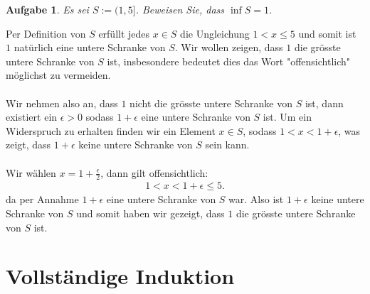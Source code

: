 \documentclass[a4paper, 20]{exam}
\newtheorem{ex}{Aufgabe}
\begin{document}
\begin{ex} Es sei $S:= (1, 5]$. Beweisen Sie, dass $\inf S=1$.
\end{ex}
\begin{solution} Per Definition von $S$ erfüllt jedes $x \in S$ die Ungleichung $1 < x \leq 5$ und somit ist $1$ natürlich eine untere Schranke von $S$. Wir wollen zeigen, dass $1$ die grösste untere Schranke von $S$ ist, insbesondere bedeutet dies das Wort "offensichtlich" möglichst zu vermeiden. 
\\\\
Wir nehmen also an, dass $1$ nicht die grösste untere Schranke von $S$ ist, dann existiert ein $\epsilon >0$ sodass $1+ \epsilon$ eine untere Schranke von $S$ ist. Um ein Widerspruch zu erhalten finden wir ein Element $x \in S$, sodass $1<x<1+ \epsilon$, was zeigt, dass $1+ \epsilon$ keine untere Schranke von $S$ sein kann. 
\\\\
Wir wählen $x= 1 + \frac{\epsilon}{2}$, dann gilt offensichtlich:
\begin{align*}
1 <x < 1 + \epsilon \leq 5.
\end{align*}
da per Annahme $1+ \epsilon$ eine untere Schranke von $S$ war. Also ist $1+ \epsilon$ keine untere Schranke von $S$ und somit haben wir gezeigt,  dass $1$ die grösste untere Schranke von $S$ ist. 

\end{solution}
\newpage 
\section{Vollständige Induktion}
\end{document}
